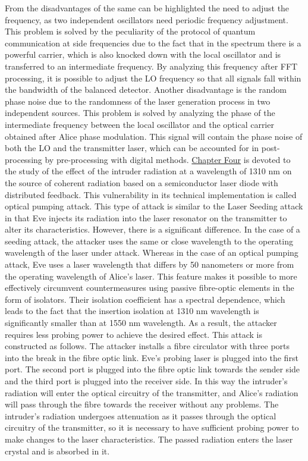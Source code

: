 {\newline From the disadvantages of the same can be highlighted the need to adjust the frequency, as two independent oscillators need periodic frequency adjustment. This problem is solved by the peculiarity of the protocol of quantum communication at side frequencies due to the fact that in the spectrum there is a powerful carrier, which is also knocked down with the local oscillator and is transferred to an intermediate frequency. By analyzing this frequency after FFT processing, it is possible to adjust the LO frequency so that all signals fall within the bandwidth of the balanced detector. Another disadvantage is the random phase noise due to the randomness of the laser generation process in two independent sources. This problem is solved by analyzing the phase of the intermediate frequency between the local oscillator and the optical carrier obtained after Alice phase modulation. This signal will contain the phase noise of both the LO and the transmitter laser, which can be accounted for in post-processing by pre-processing with digital methods. 
\newpage \underline{Chapter Four} is devoted to the study of the effect of the intruder radiation at a wavelength of 1310 nm on the source of coherent radiation based on a semiconductor laser diode with distributed feedback. This vulnerability in its technical implementation is called optical pumping attack\cite{fadeev2024b,fadeev2025}. This type of attack is similar to the Laser Seeding attack\cite{huang2019,lovic2023} in that Eve injects its radiation into the laser resonator on the transmitter to alter its characteristics. However, there is a significant difference. In the case of a seeding attack, the attacker uses the same or close wavelength to the operating wavelength of the laser under attack. Whereas in the case of an optical pumping attack, Eve uses a laser wavelength that differs by 50 nanometers or more from the operating wavelength of Alice's laser. This feature makes it possible to more effectively circumvent countermeasures using passive fibre-optic elements in the form of isolators\cite{borisova2020,nasedkin2022,nasedkin2023}. Their isolation coefficient has a spectral dependence, which leads to the fact that the insertion isolation at 1310 nm wavelength is significantly smaller than at 1550 nm wavelength. As a result, the attacker requires less probing power to achieve the desired effect. 
\newline This attack is constructed as follows. The attacker installs a fibre circulator with three ports into the break in the fibre optic link. Eve's probing laser is plugged into the first port. The second port is plugged into the fibre optic link towards the sender side and the third port is plugged into the receiver side. In this way the intruder's radiation will enter the optical circuitry of the transmitter, and Alice's radiation will pass through the fibre towards the receiver without any problems. The intruder's radiation undergoes attenuation as it passes through the optical circuitry of the transmitter, so it is necessary to have sufficient probing power to make changes to the laser characteristics. The passed radiation enters the laser crystal and is absorbed in it\cite{hui2023}.
}
